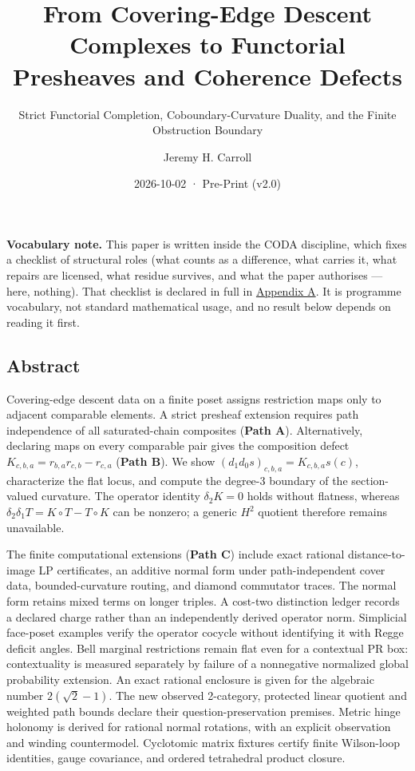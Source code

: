 \documentclass[
  english,
  10pt,
  a4paper,
]{article}
\title{From Covering-Edge Descent Complexes to Functorial Presheaves and
Coherence Defects}
\subtitle{Strict Functorial Completion, Coboundary-Curvature Duality,
and the Finite Obstruction Boundary}
\author{Jeremy H. Carroll}
\date{2026-10-02 · Pre-Print (v2.0)}
\renewenvironment{quote}
  {\begin{leftbar}\small}
  {\end{leftbar}}
\begin{document}
\maketitle

\begin{quote}
\textbf{Vocabulary note.} This paper is written inside the CODA
discipline, which fixes a checklist of structural roles (what counts as
a difference, what carries it, what repairs are licensed, what residue
survives, and what the paper authorises --- here, nothing). That
checklist is declared in full in
\hyperref[appendix-a-mechanism-inventory]{Appendix A}. It is programme
vocabulary, not standard mathematical usage, and no result below depends
on reading it first.
\end{quote}

\subsection{Abstract}\label{abstract}

Covering-edge descent data on a finite poset assigns restriction maps
only to adjacent comparable elements. A strict presheaf extension
requires path independence of all saturated-chain composites
(\textbf{Path A}). Alternatively, declaring maps on every comparable
pair gives the composition defect \(K_{c,b,a}=r_{b,a}r_{c,b}-r_{c,a}\)
(\textbf{Path B}). We show \((d_1d_0s)_{c,b,a}=K_{c,b,a}s(c)\),
characterize the flat locus, and compute the degree-3 boundary of the
section-valued curvature. The operator identity \(\delta_2K=0\) holds
without flatness, whereas \(\delta_2\delta_1T=K\circ T-T\circ K\) can be
nonzero; a generic \(H^2\) quotient therefore remains unavailable.

The finite computational extensions (\textbf{Path C}) include exact
rational distance-to-image LP certificates, an additive normal form
under path-independent cover data, bounded-curvature routing, and
diamond commutator traces. The normal form retains mixed terms on longer
triples. A cost-two distinction ledger records a declared charge rather
than an independently derived operator norm. Simplicial face-poset
examples verify the operator cocycle without identifying it with Regge
deficit angles. Bell marginal restrictions remain flat even for a
contextual PR box: contextuality is measured separately by failure of a
nonnegative normalized global probability extension. An exact rational
enclosure is given for the algebraic number \(2(\sqrt{2}-1)\). The new
observed 2-category, protected linear quotient and weighted path bounds
declare their question-preservation premises. Metric hinge holonomy is
derived for rational normal rotations, with an explicit observation and
winding countermodel. Cyclotomic matrix fixtures certify finite
Wilson-loop identities, gauge covariance, and ordered tetrahedral
product closure.
\end{document}
